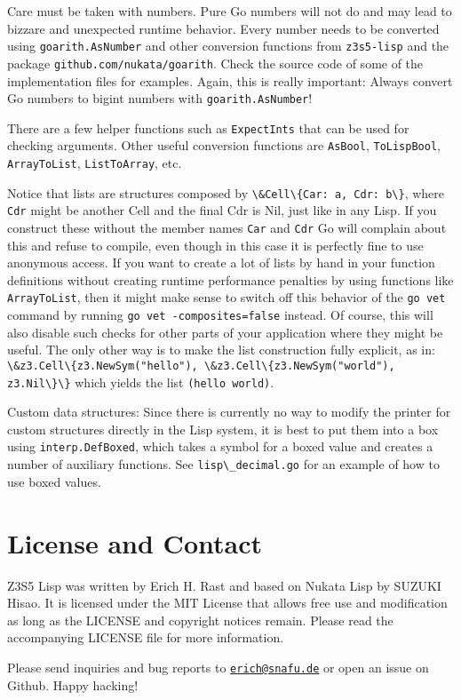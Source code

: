 \documentclass[
]{article}
\newcommand{\passthrough}[1]{#1}
\begin{document}
Care must be taken with numbers. Pure Go numbers will not do and may
lead to bizzare and unexpected runtime behavior. Every number needs to
be converted using \passthrough{\lstinline!goarith.AsNumber!} and other
conversion functions from \passthrough{\lstinline!z3s5-lisp!} and the
package \passthrough{\lstinline!github.com/nukata/goarith!}. Check the
source code of some of the implementation files for examples. Again,
this is really important: Always convert Go numbers to bigint numbers
with \passthrough{\lstinline!goarith.AsNumber!}!

There are a few helper functions such as
\passthrough{\lstinline!ExpectInts!} that can be used for checking
arguments. Other useful conversion functions are
\passthrough{\lstinline!AsBool!}, \passthrough{\lstinline!ToLispBool!},
\passthrough{\lstinline!ArrayToList!},
\passthrough{\lstinline!ListToArray!}, etc.

Notice that lists are structures composed by
\passthrough{\lstinline!\&Cell\{Car: a, Cdr: b\}!}, where
\passthrough{\lstinline!Cdr!} might be another Cell and the final Cdr is
Nil, just like in any Lisp. If you construct these without the member
names \passthrough{\lstinline!Car!} and \passthrough{\lstinline!Cdr!} Go
will complain about this and refuse to compile, even though in this case
it is perfectly fine to use anonymous access. If you want to create a
lot of lists by hand in your function definitions without creating
runtime performance penalties by using functions like
\passthrough{\lstinline!ArrayToList!}, then it might make sense to
switch off this behavior of the \passthrough{\lstinline!go vet!} command
by running \passthrough{\lstinline!go vet -composites=false!} instead.
Of course, this will also disable such checks for other parts of your
application where they might be useful. The only other way is to make
the list construction fully explicit, as in:
\passthrough{\lstinline!\&z3.Cell\{z3.NewSym("hello"), \&z3.Cell\{z3.NewSym("world"), z3.Nil\}\}!}
which yields the list \passthrough{\lstinline!(hello world)!}.

Custom data structures: Since there is currently no way to modify the
printer for custom structures directly in the Lisp system, it is best to
put them into a box using \passthrough{\lstinline!interp.DefBoxed!},
which takes a symbol for a boxed value and creates a number of auxiliary
functions. See \passthrough{\lstinline!lisp\_decimal.go!} for an example
of how to use boxed values.

\hypertarget{license-and-contact}{%
\section{License and Contact}\label{license-and-contact}}

Z3S5 Lisp was written by Erich H. Rast and based on Nukata Lisp by
SUZUKI Hisao. It is licensed under the MIT License that allows free use
and modification as long as the LICENSE and copyright notices remain.
Please read the accompanying LICENSE file for more information.

Please send inquiries and bug reports to
\href{mailto:erich@snafu.de}{\nolinkurl{erich@snafu.de}} or open an
issue on Github. Happy hacking!
\end{document}
